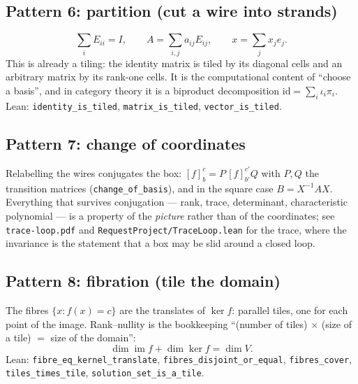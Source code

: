 \documentclass[11pt]{article}
\theoremstyle{definition}
\theoremstyle{plain}
\theoremstyle{remark}
\newcommand{\lean}[1]{\texttt{\small #1}}
\newcommand{\file}[1]{\texttt{\small #1}}
\newcommand{\id}{\mathrm{id}}
\begin{document}
\subsection{Pattern 6: partition (cut a wire into strands)}

\[
  \sum_i E_{ii} = I, \qquad A = \sum_{i,j} a_{ij} E_{ij},
  \qquad x = \sum_j x_j e_j .
\]
This is already a tiling: the identity matrix is tiled by its diagonal cells and
an arbitrary matrix by its rank-one cells.  It is the computational content of
``choose a basis'', and in category theory it is a biproduct decomposition
$\id = \sum_i \iota_i\pi_i$.  Lean: \lean{identity\_is\_tiled},
\lean{matrix\_is\_tiled}, \lean{vector\_is\_tiled}.

\subsection{Pattern 7: change of coordinates}

Relabelling the wires conjugates the box: $[f]_{b}^{c} = P\,[f]_{b'}^{c'}Q$ with
$P,Q$ the transition matrices (\lean{change\_of\_basis}), and in the square case
$B = X^{-1}AX$.  Everything that survives conjugation --- rank, trace,
determinant, characteristic polynomial --- is a property of the \emph{picture}
rather than of the coordinates; see \file{trace-loop.pdf} and
\file{RequestProject/TraceLoop.lean} for the trace, where the invariance is the
statement that a box may be slid around a closed loop.

\subsection{Pattern 8: fibration (tile the domain)}

\begin{center}
\end{center}

\noindent
The fibres $\{x : f(x) = c\}$ are the translates of $\ker f$: parallel tiles,
one for each point of the image.  Rank--nullity is the bookkeeping
``(number of tiles) $\times$ (size of a tile) $=$ size of the domain'':
\[
  \dim \operatorname{im} f + \dim \ker f = \dim V .
\]
Lean: \lean{fibre\_eq\_kernel\_translate}, \lean{fibres\_disjoint\_or\_equal},
\lean{fibres\_cover}, \lean{tiles\_times\_tile}, \lean{solution\_set\_is\_a\_tile}.
\end{document}
